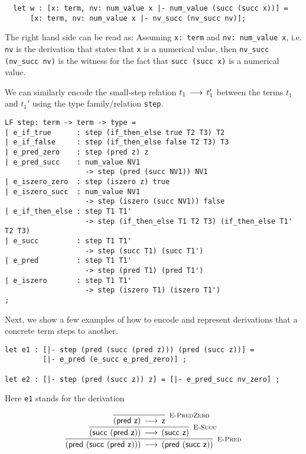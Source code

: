 \begin{lstlisting}
  let w : [x: term, nv: num_value x |- num_value (succ (succ x))] =
      [x: term, nv: num_value x |- nv_succ (nv_succ nv)];
\end{lstlisting}

The  right  hand  side   can  be  read  as:   Assuming  \lstinline!x: term!  and
\lstinline!nv: num_value x!,  i.e. \lstinline!nv!  is the derivation that states
that \lstinline!x! is  a numerical value,  then \lstinline!nv_succ (nv_succ nv)!
is the witness for the fact that \lstinline!succ (succ x)! is a numerical value.

We can similarly  encode the small-step relation  $t_1 \mathrel{\,\longrightarrow\,} t_1'$  between the
terms $t_1$ and $t_1'$ using the type family/relation \lstinline!step!.

\begin{lstlisting}
LF step: term -> term -> type =
| e_if_true      : step (if_then_else true T2 T3) T2
| e_if_false     : step (if_then_else false T2 T3) T3
| e_pred_zero    : step (pred z) z
| e_pred_succ    : num_value NV1
                   -> step (pred (succ NV1)) NV1
| e_iszero_zero  : step (iszero z) true
| e_iszero_succ  : num_value NV1
                   -> step (iszero (succ NV1)) false
| e_if_then_else : step T1 T1'
                   -> step (if_then_else T1 T2 T3) (if_then_else T1' T2 T3)
| e_succ         : step T1 T1'
                   -> step (succ T1) (succ T1')
| e_pred         : step T1 T1'
                   -> step (pred T1) (pred T1')
| e_iszero       : step T1 T1'
                   -> step (iszero T1) (iszero T1')
;
\end{lstlisting}

Next,  we show a few examples of  how to encode and represent derivations that a
concrete term steps to another.

\begin{lstlisting}
let e1 : [|- step (pred (succ (pred z))) (pred (succ z))] =
         [|- e_pred (e_succ e_pred_zero)] ;

let e2 : [|- step (pred (succ z)) z] = [|- e_pred_succ nv_zero] ;
\end{lstlisting}


Here \lstinline!e1! stands for the derivation


\[
\begin{array}{c}
\infer[\EPred]{(\tmpred {(\tmsucc {(\tmpred {\tmzero})})}) \Steps (\tmpred {(\tmsucc {\tmzero})})}
{\infer[\ESucc]{(\tmsucc {(\tmpred {\tmzero})}) \Steps (\tmsucc {\tmzero} )}
 {\infer[\EPredZ]{(\tmpred {\tmzero}) \Steps \tmzero}{}}
}
\end{array}
\]

